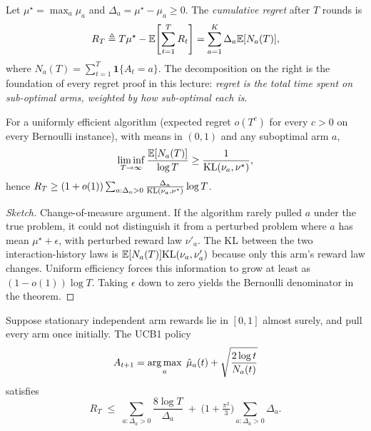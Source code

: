 \documentclass[11pt,oneside]{scrbook}
\begin{document}
Let $\mu^\star = \max_a \mu_a$ and $\Delta_a = \mu^\star - \mu_a \ge 0$. The
\emph{cumulative regret} after $T$ rounds is
\begin{equation}
R_T \triangleq T\mu^\star - \mathbb{E}\!\left[\sum_{t=1}^T R_t\right]
     = \sum_{a=1}^K \Delta_a \mathbb{E}[N_a(T)],
\label{eq:regret-decomp}
\end{equation}
where $N_a(T) = \sum_{t=1}^T \mathbf{1}\{A_t=a\}$. The decomposition on the
right is the foundation of every regret proof in this lecture: \emph{regret is
the total time spent on sub-optimal arms, weighted by how sub-optimal each is}.

\begin{theorem}
For a uniformly efficient algorithm (expected regret $o(T^c)$ for every
$c>0$ on every Bernoulli instance), with means in $(0,1)$ and any
suboptimal arm $a$,
\[
\liminf_{T\to\infty} \frac{\mathbb{E}[N_a(T)]}{\log T} \ge \frac{1}{\mathrm{KL}(\nu_a, \nu^\star)},
\]
hence $R_T \ge (1+o(1))\sum_{a:\Delta_a>0}\frac{\Delta_a}{\mathrm{KL}(\nu_a,\nu^\star)}\log T$.
\end{theorem}

\begin{proof}[Sketch]
Change-of-measure argument. If the algorithm rarely pulled $a$ under the true
problem, it could not distinguish it from a perturbed problem where $a$ has
mean $\mu^\star + \epsilon$, with perturbed reward law $\nu'_a$. The KL
between the two interaction-history laws is
$\mathbb{E}[N_a(T)]\mathrm{KL}(\nu_a,\nu'_a)$ because only this arm's reward law changes.
Uniform efficiency forces this information to grow at least as
$(1-o(1))\log T$. Taking $\epsilon$ down to zero yields the Bernoulli
denominator in the theorem. \qedhere
\end{proof}

\begin{theorem}
Suppose stationary independent arm rewards lie in $[0,1]$ almost surely,
and pull every arm once initially. The UCB1 policy
\[
A_{t+1} = \operatorname*{arg\,max}_a \;\hat\mu_a(t) + \sqrt{\frac{2\log t}{N_a(t)}}
\]
satisfies
\begin{equation}
R_T \;\le\; \sum_{a:\Delta_a>0}\frac{8\log T}{\Delta_a}
         \;+\; \Big(1+\tfrac{\pi^2}{3}\Big)\sum_{a:\Delta_a>0}\Delta_a.
\label{eq:ucb1-bound}
\end{equation}
\end{theorem}
\end{document}
